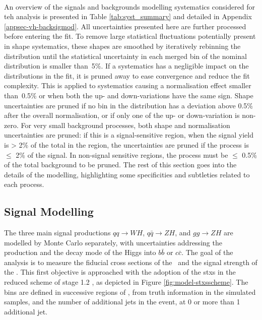 \paragraph{}An overview of the signals and backgrounds modelling systematics considered for teh analysis is presented in Table \ref{tab:syst_summary} and detailed in Appendix \ref{appsec-vh-backsigmod}. All uncertainties presented here are further processed before entering the fit. To remove large statistical fluctuations potentially present in shape systematics, these shapes are smoothed by iteratively rebinning the distribution until the statistical uncertainty in each merged bin of the nominal distribution is smaller than~5\%. If a systematics has a negligible impact on the distributions in the fit, it is pruned away to ease convergence and reduce the fit complexity. This is applied to systematics causing a normalisation effect smaller than~0.5\% or when both the up- and down-variations have the same sign. Shape uncertainties are pruned if no bin in the distribution has a deviation above 0.5\% after the overall normalisation, or if only one of the up- or down-variation is non-zero. For very small background processes, both shape and normalisation uncertainties are pruned: if this is a signal-sensitive region, when the signal yield is > 2\% of the total in the region, the uncertainties are pruned if the process is $\leq$ 2\% of the signal. In non-signal sensitive regions, the process must be $\leq$ 0.5\% of the total background to be pruned. The rest of this section goes into the details of the modelling, highlighting some specificities and subtleties related to each process. 

\subsection{Signal Modelling}\label{sec-modSignal}
The three main signal productions $qq \rightarrow WH$, $q\bar{q} \rightarrow ZH$, and $gg \rightarrow ZH$ are modelled by Monte Carlo separately, with uncertainties addressing the production and the decay mode of the Higgs into $b\bar{b}$ or $c\bar{c}$. The goal of the analysis is to measure the fiducial cross sections of the \vhb\ and the signal strength of the \vhc. This first objective is approached with the adoption of the \gls{stxs} in the reduced scheme of stage 1.2 \cite{badger2016les, berger2019simplified}, as depicted in Figure \ref{fig:model-stxsscheme}. The bins are defined in successive regions of \ptv, from truth information in the simulated samples, and the number of additional jets in the event, at 0 or more than 1 additional jet.
  
